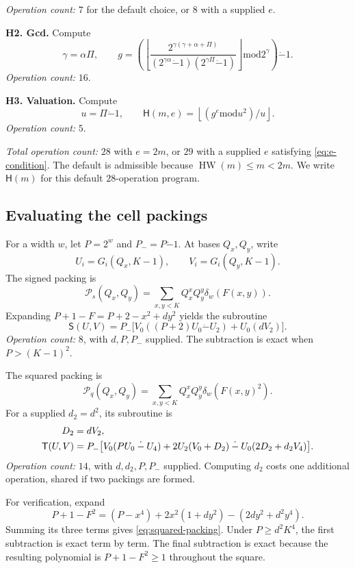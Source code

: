 \documentclass[11pt]{article}
\theoremstyle{remark}
\newcommand{\tsub}{\mathbin{\dot{-}}}
\newcommand{\md}{\mathbin{\mathrm{mod}}}
\newcommand{\fl}[1]{\left\lfloor #1\right\rfloor}
\newcommand{\HW}{\operatorname{HW}}
\newcommand{\Signed}{\mathsf{S}}
\newcommand{\Squared}{\mathsf{T}}
\begin{document}
\emph{Operation count:} $7$ for the default choice, or $8$ with a
supplied $e$.

\textbf{H2. Gcd.} Compute
\[
  \gamma=\alpha\Pi,\qquad
  g=\left(\fl{\frac{2^{\gamma(\gamma+\alpha+\Pi)}}
  {(2^{\gamma\alpha}\tsub1)(2^{\gamma\Pi}\tsub1)}}
  \md 2^\gamma\right)\tsub1.
\]
\emph{Operation count:} $16$.

\textbf{H3. Valuation.} Compute
\[
  u=\Pi\tsub1,\qquad
  \mathsf H(m,e)=\fl{(g^e\md u^2)/u}.
\]
\emph{Operation count:} $5$.

\emph{Total operation count:} $28$ with $e=2m$, or $29$ with a
supplied $e$ satisfying \eqref{eq:e-condition}.
The default is admissible because $\HW(m)\le m<2m$.
We write $\mathsf H(m)$ for this default $28$-operation program.

\subsection{Evaluating the cell packings}\label{sec:packing-formulas}

For a width $w$, let $P=2^w$ and $P_-=P\tsub1$.
At bases $Q_x,Q_y$, write
\[
  U_i=G_i(Q_x,K-1),\qquad V_i=G_i(Q_y,K-1).
\]
The signed packing is
\[
  \mathcal P_s(Q_x,Q_y)
  =\sum_{x,y<K}Q_x^xQ_y^y\delta_w(F(x,y)).
\]
Expanding $P+1-F=P+2-x^2+dy^2$ yields the subroutine
\begin{equation}\label{eq:signed-packing}
  \Signed(U,V)
  =P_-\bigl[V_0((P+2)U_0\tsub U_2)+U_0(dV_2)\bigr].
\end{equation}
\emph{Operation count:} $8$, with $d,P,P_-$ supplied.
The subtraction is exact when $P>(K-1)^2$.

The squared packing is
\[
  \mathcal P_q(Q_x,Q_y)
  =\sum_{x,y<K}Q_x^xQ_y^y\delta_w(F(x,y)^2).
\]
For a supplied $d_2=d^2$, its subroutine is
\begin{align}
  D_2&=dV_2,\notag\\
  \Squared(U,V)
    &=P_-\bigl[V_0(PU_0\tsub U_4)
       +2U_2(V_0+D_2)\tsub U_0(2D_2+d_2V_4)\bigr].
       \label{eq:squared-packing}
\end{align}
\emph{Operation count:} $14$, with $d,d_2,P,P_-$ supplied.
Computing $d_2$ costs one additional operation, shared if two packings
are formed.

For verification, expand
\[
  P+1-F^2=(P-x^4)+2x^2(1+dy^2)-(2dy^2+d^2y^4).
\]
Summing its three terms gives \eqref{eq:squared-packing}.
Under $P\ge d^2K^4$, the first subtraction is exact term by term.
The final subtraction is exact because the resulting polynomial is
$P+1-F^2\ge1$ throughout the square.
\end{document}
